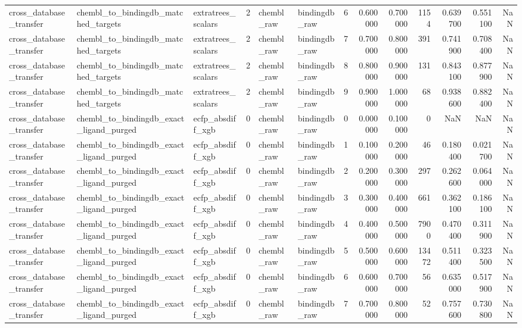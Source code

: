 \begin{longtable}{lllrllrrrrrrr}
cross\_database\_transfer & chembl\_to\_bindingdb\_matched\_targets & extratrees\_scalars & 2 & chembl\_raw & bindingdb\_raw & 6 & 0.600000 & 0.700000 & 1154 & 0.639700 & 0.551100 & NaN \\
cross\_database\_transfer & chembl\_to\_bindingdb\_matched\_targets & extratrees\_scalars & 2 & chembl\_raw & bindingdb\_raw & 7 & 0.700000 & 0.800000 & 391 & 0.741900 & 0.708400 & NaN \\
cross\_database\_transfer & chembl\_to\_bindingdb\_matched\_targets & extratrees\_scalars & 2 & chembl\_raw & bindingdb\_raw & 8 & 0.800000 & 0.900000 & 131 & 0.843100 & 0.877900 & NaN \\
cross\_database\_transfer & chembl\_to\_bindingdb\_matched\_targets & extratrees\_scalars & 2 & chembl\_raw & bindingdb\_raw & 9 & 0.900000 & 1.000000 & 68 & 0.938600 & 0.882400 & NaN \\
cross\_database\_transfer & chembl\_to\_bindingdb\_exact\_ligand\_purged & ecfp\_absdiff\_xgb & 0 & chembl\_raw & bindingdb\_raw & 0 & 0.000000 & 0.100000 & 0 & NaN & NaN & NaN \\
cross\_database\_transfer & chembl\_to\_bindingdb\_exact\_ligand\_purged & ecfp\_absdiff\_xgb & 0 & chembl\_raw & bindingdb\_raw & 1 & 0.100000 & 0.200000 & 46 & 0.180400 & 0.021700 & NaN \\
cross\_database\_transfer & chembl\_to\_bindingdb\_exact\_ligand\_purged & ecfp\_absdiff\_xgb & 0 & chembl\_raw & bindingdb\_raw & 2 & 0.200000 & 0.300000 & 297 & 0.262600 & 0.064000 & NaN \\
cross\_database\_transfer & chembl\_to\_bindingdb\_exact\_ligand\_purged & ecfp\_absdiff\_xgb & 0 & chembl\_raw & bindingdb\_raw & 3 & 0.300000 & 0.400000 & 661 & 0.362100 & 0.186100 & NaN \\
cross\_database\_transfer & chembl\_to\_bindingdb\_exact\_ligand\_purged & ecfp\_absdiff\_xgb & 0 & chembl\_raw & bindingdb\_raw & 4 & 0.400000 & 0.500000 & 7900 & 0.470400 & 0.311900 & NaN \\
cross\_database\_transfer & chembl\_to\_bindingdb\_exact\_ligand\_purged & ecfp\_absdiff\_xgb & 0 & chembl\_raw & bindingdb\_raw & 5 & 0.500000 & 0.600000 & 13472 & 0.511400 & 0.323500 & NaN \\
cross\_database\_transfer & chembl\_to\_bindingdb\_exact\_ligand\_purged & ecfp\_absdiff\_xgb & 0 & chembl\_raw & bindingdb\_raw & 6 & 0.600000 & 0.700000 & 56 & 0.635000 & 0.517900 & NaN \\
cross\_database\_transfer & chembl\_to\_bindingdb\_exact\_ligand\_purged & ecfp\_absdiff\_xgb & 0 & chembl\_raw & bindingdb\_raw & 7 & 0.700000 & 0.800000 & 52 & 0.757600 & 0.730800 & NaN \\

\end{longtable}
